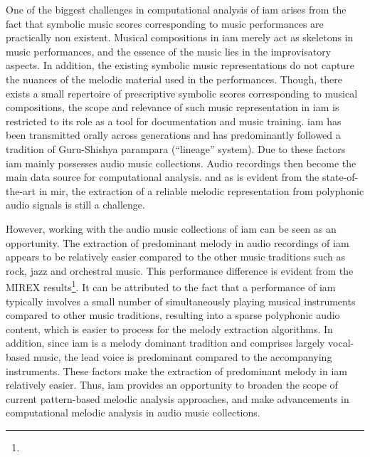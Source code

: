 One of the biggest challenges in computational analysis of \gls{iam} arises from the fact that symbolic music scores corresponding to music performances are practically non existent. Musical compositions in \gls{iam} merely act as skeletons in music performances, and the essence of the music lies in the improvisatory aspects. In addition, the existing symbolic music representations do not capture the nuances of the melodic material used in the performances. Though, there exists a small repertoire of prescriptive symbolic scores corresponding to musical compositions, the scope and relevance of such music representation in \gls{iam} is restricted to its role as a tool for documentation and music training. \Gls{iam} has been transmitted orally across generations and has predominantly followed a tradition of Guru-Shishya parampara (``lineage'' system).  Due to these factors \gls{iam} mainly possesses audio music collections. Audio recordings then become the main data source for computational analysis. and as is evident from the state-of-the-art in \gls{mir}, the extraction of a reliable melodic representation from polyphonic audio signals is still a challenge. 

However, working with the audio music collections of \gls{iam} can be seen as an opportunity.  The extraction of predominant melody in audio recordings of \gls{iam} appears to be relatively easier compared to the other music traditions such as rock, jazz and orchestral music. This performance difference is evident from the MIREX results\footnote{}. It can be attributed to the fact that a performance of \gls{iam} typically involves a small number of simultaneously playing musical instruments compared to other music traditions, resulting into a sparse polyphonic audio content, which is easier to process for the melody extraction algorithms. In addition, since \gls{iam} is a melody dominant tradition and comprises largely vocal-based music, the lead voice is predominant compared to the accompanying instruments. These factors make the extraction of predominant melody in \gls{iam} relatively easier. Thus, \gls{iam} provides an opportunity to broaden the scope of current pattern-based melodic analysis approaches, and make advancements in computational melodic analysis in audio music collections.

